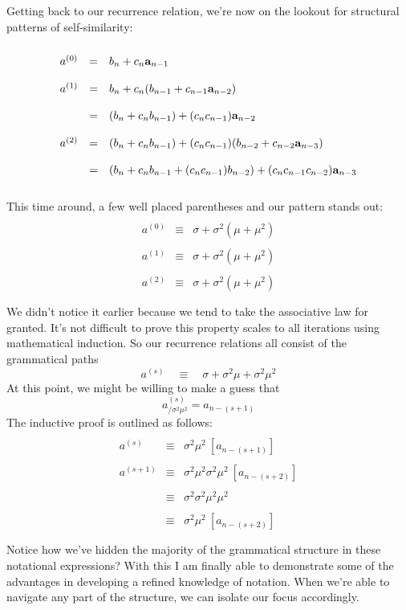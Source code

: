 \documentclass[twoside]{article}
\begin{document}
Getting back to our recurrence relation, we're now on the lookout for structural patterns of self-similarity:
$$ \begin{array}{rcl}
											\\
a^{(0)}	& = & b_n+c_n{\bf a}_{n-1}							\\
											\\
a^{(1)}	& = & b_n+c_n(b_{n-1}+c_{n-1}{\bf a}_{n-2})					\\
     											\\
	& = & (b_n+c_nb_{n-1})+(c_nc_{n-1}){\bf a}_{n-2}				\\
     											\\
a^{(2)}	& = & (b_n+c_nb_{n-1})+(c_nc_{n-1})(b_{n-2}+c_{n-2}{\bf a}_{n-3})		\\
     											\\
	& = & (b_n+c_nb_{n-1}+(c_nc_{n-1})b_{n-2})+(c_nc_{n-1}c_{n-2}){\bf a}_{n-3}	\\
											\\
\end{array} $$
This time around, a few well placed parentheses and our pattern stands out:
$$ \begin{array}{rcl}
									\\
a^{(0)}	& \equiv & \sigma+\sigma^2(\mu+\mu^2) 				\\
	   	   							\\
a^{(1)}	& \equiv & \sigma+\sigma^2(\mu+\mu^2) 				\\
	   	   							\\
a^{(2)}	& \equiv & \sigma+\sigma^2(\mu+\mu^2) 				\\
									\\
\end{array} $$
We didn't notice it earlier because we tend to take the associative law for granted.
It's not difficult to prove this property scales to all iterations using mathematical induction.
So our recurrence relations all consist of the grammatical paths
$$ a^{(s)}\quad\equiv\quad\sigma+\sigma^2\mu+\sigma^2\mu^2 $$
At this point, we might be willing to make a guess that
$$ a^{(s)}_{/\sigma^2\mu^2}=a_{n-(s+1)} $$
The inductive proof is outlined as follows:
$$ \begin{array}{rcl}
													\\
a^{(s)}		& \equiv & \sigma^2\mu^2\ [a_{n-(s+1)}]			 				\\
													\\
a^{(s+1)}	& \equiv & \sigma^2\mu^2\sigma^2\mu^2\ [a_{n-(s+2)}]				 	\\
													\\
		& \equiv & \sigma^2\sigma^2\mu^2\mu^2				 			\\
													\\
		& \equiv & \sigma^2\mu^2\ [a_{n-(s+2)}]						 	\\
													\\
\end{array} $$
Notice how we've hidden the majority of the grammatical structure in these notational expressions?
With this I am finally able to demonstrate some of the advantages in developing a refined knowledge of notation.
When we're able to navigate any part of the structure, we can isolate our focus accordingly.
\end{document}

